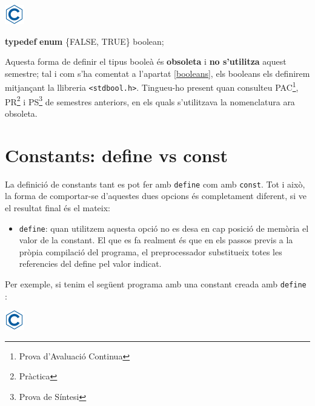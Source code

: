 \documentclass[]{book}
\newenvironment{Shaded}{\begin{snugshade}}{\end{snugshade}}
\newcommand{\KeywordTok}[1]{\textcolor[rgb]{0.13,0.29,0.53}{\textbf{#1}}}
\newcommand{\NormalTok}[1]{#1}
\providecommand{\tightlist}{%
  \setlength{\itemsep}{0pt}\setlength{\parskip}{0pt}}
\let\rmarkdownfootnote\footnote%
\def\footnote{\protect\rmarkdownfootnote}
\begin{document}
\includegraphics{./img/c.png}

\begin{Shaded}
\begin{Highlighting}[]
\KeywordTok{typedef} \KeywordTok{enum}\NormalTok{ \{FALSE, TRUE\} boolean;}
\end{Highlighting}
\end{Shaded}

Aquesta forma de definir el tipus booleà és \textbf{obsoleta} i \textbf{no s'utilitza} aquest semestre; tal i com s'ha comentat a l'apartat \ref{booleans}, els booleans els definirem mitjançant la llibreria \texttt{\textless{}stdbool.h\textgreater{}}. Tingueu-ho present quan consulteu PAC\footnote{Prova d'Avaluació Continua}, PR\footnote{Pràctica} i PS\footnote{Prova de Síntesi} de semestres anteriors, en els quals s'utilitzava la nomenclatura ara obsoleta.

\hypertarget{constants-define-vs-const}{%
\section{Constants: define vs const}\label{constants-define-vs-const}}

La definició de constants tant es pot fer amb \texttt{define} com amb \texttt{const}. Tot i això, la forma de comportar-se d'aquestes dues opcions és completament diferent, si ve el resultat final és el mateix:

\begin{itemize}
\tightlist
\item
  \texttt{define}: quan utilitzem aquesta opció no es desa en cap posició de memòria el valor de la constant. El que es fa realment és que en els passos previs a la pròpia compilació del programa, el preprocessador substitueix totes les referencies del define pel valor indicat.
\end{itemize}

Per exemple, si tenim el següent programa amb una constant creada amb \texttt{define} :

\includegraphics{./img/c.png}
\end{document}
